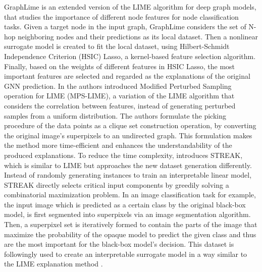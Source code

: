 \documentclass[journal]{IEEEtran}
\begin{document}
GraphLime \cite{Huang2020} is an extended version of the LIME algorithm for deep graph models, that studies the importance of different node features for node classification tasks. Given a target node in the input graph, GraphLime considers the set of N-hop neighboring nodes and their predictions as its local dataset. Then a nonlinear surrogate model is created to fit the local dataset, using Hilbert-Schmidt Independence Criterion (HSIC) Lasso, a kernel-based feature selection algorithm. Finally, based on the weights of different features in HSIC Lasso, the most important features are selected and regarded as the explanations of the original GNN prediction. 
In \cite{Shi2020} the authors introduced Modified Perturbed Sampling operation for LIME (MPS-LIME), a variation of the LIME algorithm that considers the correlation between features, instead of generating perturbed samples from a uniform distribution. The authors formulate the picking procedure of the data points as a clique set construction operation, by converting the original image’s superpixels to an undirected graph. This formulation makes the method more time-efficient and enhances the understandability of the produced explanations. 
To reduce the time complexity, \cite{Elenberg2017} introduces STREAK, which is similar to LIME \cite{Ribeiro2016} but approaches the new dataset generation differently. Instead of randomly generating instances to train an interpretable linear model, STREAK directly selects critical input components by greedily solving a combinatorial maximization problem. In an image classification task for example, the input image which is predicted as a certain class by the original black-box model, is first segmented into superpixels via an image segmentation algorithm. Then, a superpixel set is iteratively formed to contain the parts of the image that maximize the probability of the opaque model to predict the given class and thus are the most important for the black-box model’s decision. This dataset is followingly used to create an interpretable surrogate model in a way similar to the LIME explanation method \cite{Ribeiro2016}.
\end{document}
